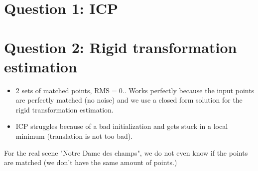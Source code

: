 \documentclass[a4paper]{article}
\begin{document}




\section{Question 1: ICP}



\section{Question 2: Rigid transformation estimation}
\begin{itemize}
  \item 2 sets of matched points, $\text{RMS} = 0.$.
Works perfectly because the input points are perfectly matched (no noise) and we use a closed form solution for the rigid transformation estimation.
  \item ICP struggles because of a bad initialization and gets stuck in a local minimum (translation is not too bad).
\end{itemize}

For the real scene "Notre Dame des champs", we do not even know if the points are matched (we don't have the same amount of points.) 

\end{document}
